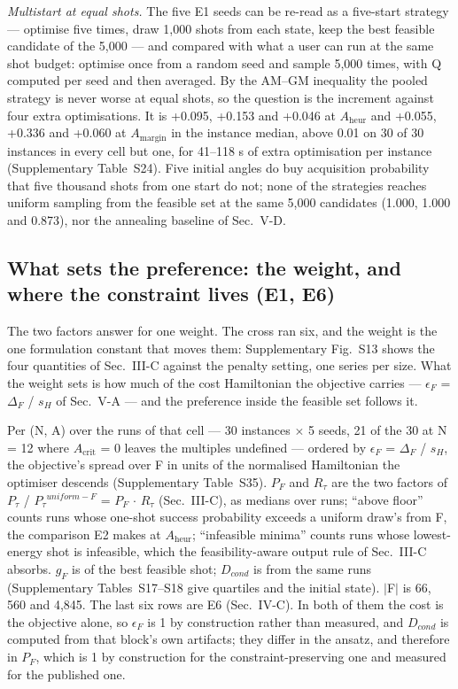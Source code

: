 \documentclass{ieeeaccess}
\begin{document}
\textit{Multistart at equal shots.} The five E1 seeds can be re-read as a five-start strategy --- optimise five times, draw 1,000 shots from each state, keep the best feasible candidate of the 5,000 --- and compared with what a user can run at the same shot budget: optimise once from a random seed and sample 5,000 times, with Q computed per seed and then averaged. By the AM--GM inequality the pooled strategy is never worse at equal shots, so the question is the increment against four extra optimisations. It is +0.095, +0.153 and +0.046 at $A_{\mathrm{heur}}$ and +0.055, +0.336 and +0.060 at $A_{\mathrm{margin}}$ in the instance median, above 0.01 on 30 of 30 instances in every cell but one, for 41--118 s of extra optimisation per instance (Supplementary Table~S24). Five initial angles do buy acquisition probability that five thousand shots from one start do not; none of the strategies reaches uniform sampling from the feasible set at the same 5,000 candidates (1.000, 1.000 and 0.873), nor the annealing baseline of Sec.~V-D.


\subsection{What sets the preference: the weight, and where the constraint lives (E1, E6)}


The two factors answer for one weight. The cross ran six, and the weight is the one formulation constant that moves them: Supplementary Fig.~S13 shows the four quantities of Sec.~III-C against the penalty setting, one series per size. What the weight sets is how much of the cost Hamiltonian the objective carries --- $\epsilon_{F}$ = $\Delta_{F}$ / $s_{H}$ of Sec.~V-A --- and the preference inside the feasible set follows it.


Per (N, A) over the runs of that cell --- 30 instances $\times$ 5 seeds, 21 of the 30 at N = 12 where $A_{\mathrm{crit}}$ = 0 leaves the multiples undefined --- ordered by $\epsilon_{F}$ = $\Delta_{F}$ / $s_{H}$, the objective's spread over F in units of the normalised Hamiltonian the optimiser descends (Supplementary Table~S35). $P_{F}$ and $R_{\tau}$ are the two factors of $P_{\tau}$ / $P_{\tau}$$^{uniform-F}$ = $P_{F}$ $\cdot$ $R_{\tau}$ (Sec.~III-C), as medians over runs; ``above floor'' counts runs whose one-shot success probability exceeds a uniform draw's from F, the comparison E2 makes at $A_{\mathrm{heur}}$; ``infeasible minima'' counts runs whose lowest-energy shot is infeasible, which the feasibility-aware output rule of Sec.~III-C absorbs. $g_{F}$ is of the best feasible shot; $D_{cond}$ is from the same runs (Supplementary Tables~S17--S18 give quartiles and the initial state). $|$F$|$ is 66, 560 and 4,845. The last six rows are E6 (Sec.~IV-C). In both of them the cost is the objective alone, so $\epsilon_{F}$ is 1 by construction rather than measured, and $D_{cond}$ is computed from that block's own artifacts; they differ in the ansatz, and therefore in $P_{F}$, which is 1 by construction for the constraint-preserving one and measured for the published one.
\end{document}
